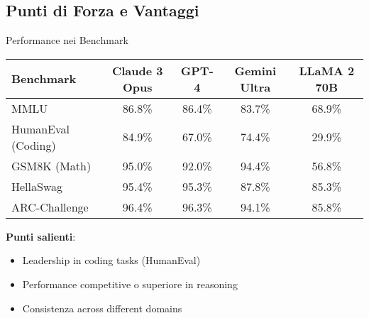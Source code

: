 \documentclass[aspectratio=169]{beamer}
\begin{document}
\subsection{Punti di Forza e Vantaggi}
%
%
\begin{frame}{Performance nei Benchmark}
\begin{table}[h]
\centering
\small
\begin{tabular}{|l|c|c|c|c|}
\hline
\textbf{Benchmark} & \textbf{Claude 3 Opus} & \textbf{GPT-4} & \textbf{Gemini Ultra} & \textbf{LLaMA 2 70B} \\
\hline
MMLU & 86.8\% & 86.4\% & 83.7\% & 68.9\% \\
\hline
HumanEval (Coding) & 84.9\% & 67.0\% & 74.4\% & 29.9\% \\
\hline
GSM8K (Math) & 95.0\% & 92.0\% & 94.4\% & 56.8\% \\
\hline
HellaSwag & 95.4\% & 95.3\% & 87.8\% & 85.3\% \\
\hline
ARC-Challenge & 96.4\% & 96.3\% & 94.1\% & 85.8\% \\
\hline
\end{tabular}
\end{table}

\textbf{Punti salienti}:
\begin{itemize}
    \item Leadership in coding tasks (HumanEval)
    \item Performance competitive o superiore in reasoning
    \item Consistenza across different domains
\end{itemize}
\end{frame}
%
%
\end{document}
